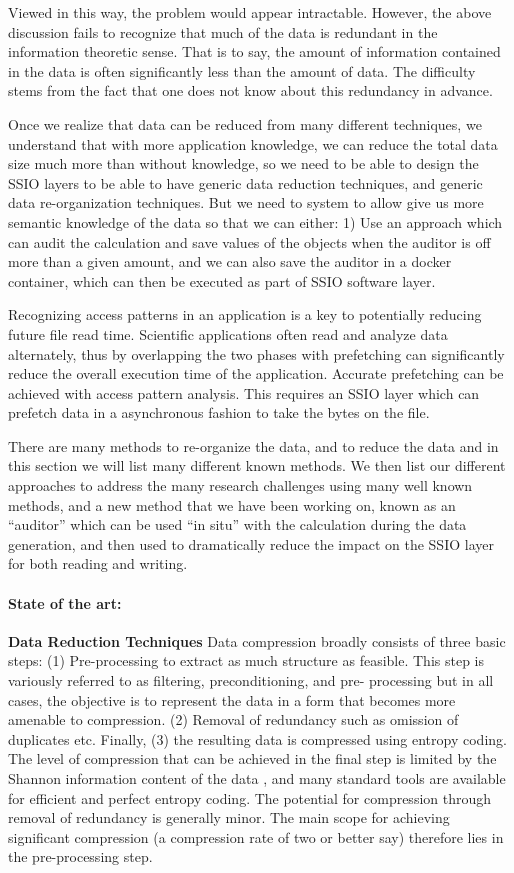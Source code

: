 Viewed in this way, the problem would appear intractable. However, the above
discussion fails to recognize that much of the data is redundant in the
information theoretic sense.  That is to say, the amount of information
contained in the data is often significantly less than the amount of data.  The
difficulty stems from the fact that one does not know about this redundancy in
advance. 

Once we realize that data can be reduced from many different techniques, we understand
that with more application knowledge, we can reduce the total data size much more than without
knowledge, so we need to be able to design the SSIO layers to be able to have generic
data reduction techniques, and generic data re-organization techniques. But we need to system
to allow give us more semantic knowledge of the data so that we can either: 1) Use an approach
which can audit the calculation and save values of the objects when the auditor is off more than a given
amount, and we can also save the auditor in a docker container, which can then be executed as part of 
SSIO software layer.  

Recognizing access patterns in an application is a key to potentially reducing
future file read time. Scientific applications often read and analyze data alternately,
thus by overlapping the two phases with prefetching can significantly
reduce the overall execution time of the application. Accurate prefetching can
be achieved with access pattern analysis. This requires an SSIO layer which can
prefetch data in a asynchronous fashion to take the bytes on the file.

There are many methods to re-organize the data, and to reduce the data and in this section we will list many
different known methods.  We then list our different approaches to address the many research challenges using
many well known methods, and a new method that we have been working on, known as an ``auditor'' which can be
used ``in situ'' with the calculation during the data generation, and then used to dramatically reduce the impact on the SSIO
layer for both reading and writing.


\paragraph{State of the art:}
{\bf Data Reduction Techniques} Data compression broadly consists of three basic steps: (1) Pre-processing to
extract as much structure as feasible. This step is variously referred to as
filtering, preconditioning, and pre- processing but in all cases, the objective
is to represent the data in a form that becomes more amenable to compression.
(2) Removal of redundancy such as omission of duplicates etc.  Finally, (3) the
resulting data is compressed using entropy coding. The level of compression
that can be achieved in the final step is limited by the Shannon information
content of the data \cite{Gray:book}, and many standard tools are available for
efficient and perfect entropy coding. The potential for compression through
removal of redundancy is generally minor. The main scope for achieving
significant compression (a compression rate of two or better say) therefore
lies in the pre-processing step.

